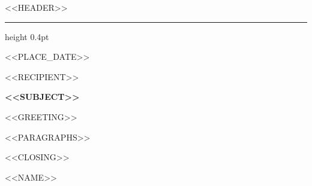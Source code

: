 \documentclass[10pt,a4paper]{article}
\begin{document}
<<HEADER>>
\vspace{4pt}\hrule height 0.4pt
\vspace{8pt}

<<PLACE_DATE>>

<<RECIPIENT>>

\textbf{<<SUBJECT>>}

<<GREETING>>

<<PARAGRAPHS>>

<<CLOSING>>

<<NAME>>
\end{document}
